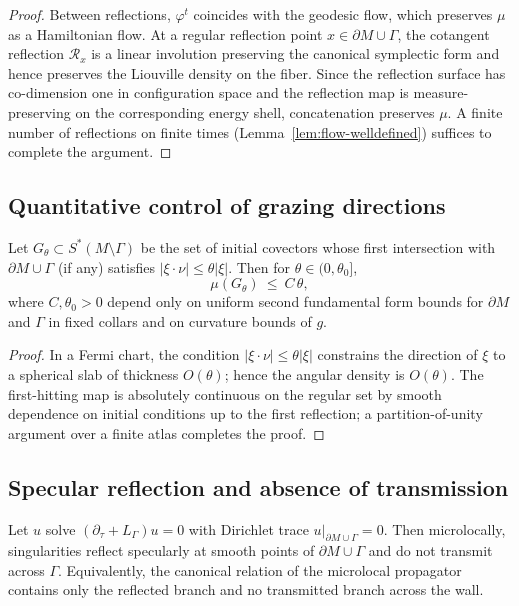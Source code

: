 \begin{proof}
Between reflections, $\varphi^t$ coincides with the geodesic flow, which preserves $\mu$ as a Hamiltonian flow. At a regular reflection point $x\in \partial M\cup\Gamma$, the cotangent reflection $\mathcal R_x$ is a linear involution preserving the canonical symplectic form and hence preserves the Liouville density on the fiber. Since the reflection surface has co-dimension one in configuration space and the reflection map is measure-preserving on the corresponding energy shell, concatenation preserves $\mu$. A finite number of reflections on finite times (Lemma~\ref{lem:flow-welldefined}) suffices to complete the argument.
\end{proof}

\subsection{Quantitative control of grazing directions}
\begin{lemma}
\label{lem:quant-grazing}
Let $G_\theta\subset S^*(M\setminus\Gamma)$ be the set of initial covectors whose first intersection with $\partial M\cup\Gamma$ (if any) satisfies $|\xi\cdot\nu|\le \theta|\xi|$.
Then for $\theta\in(0,\theta_0]$,
\[
\mu(G_\theta)\ \le\ C\,\theta,
\]
where $C,\theta_0>0$ depend only on uniform second fundamental form bounds for $\partial M$ and $\Gamma$ in fixed collars and on curvature bounds of $g$.
\end{lemma}

\begin{proof}
In a Fermi chart, the condition $|\xi\cdot\nu|\le \theta|\xi|$ constrains the direction of $\xi$ to a spherical slab of thickness $O(\theta)$; hence the angular density is $O(\theta)$. The first-hitting map is absolutely continuous on the regular set by smooth dependence on initial conditions up to the first reflection; a partition-of-unity argument over a finite atlas completes the proof.
\end{proof}

\subsection{Specular reflection and absence of transmission}
\begin{proposition}
\label{prop:no-transmission}
Let $u$ solve $(\partial_\tau+L_\Gamma)u=0$ with Dirichlet trace $u|_{\partial M\cup\Gamma}=0$.
Then microlocally, singularities reflect specularly at smooth points of $\partial M\cup\Gamma$ and do not transmit across $\Gamma$. 
Equivalently, the canonical relation of the microlocal propagator contains only the reflected branch and no transmitted branch across the wall.
\end{proposition}

